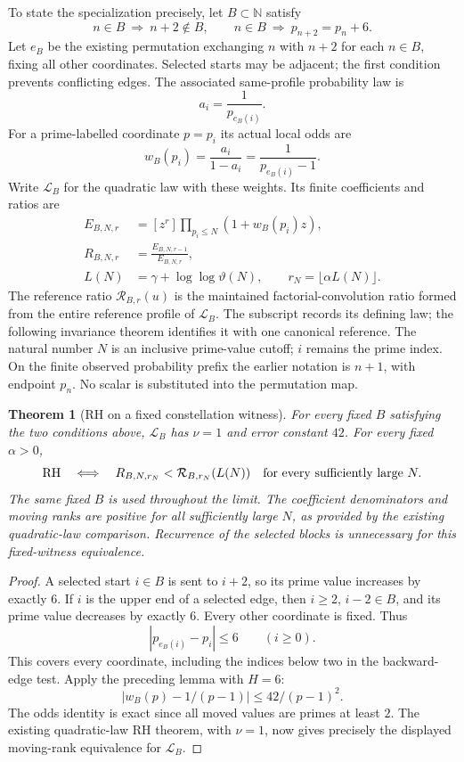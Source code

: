 \documentclass[11pt]{article}
\newtheorem{theorem}{Theorem}[section]
\theoremstyle{definition}
\begin{document}
To state the specialization precisely, let $B\subset\mathbb N$
satisfy
\[
 n\in B\ \Longrightarrow\ n+2\notin B,\qquad
 n\in B\ \Longrightarrow\ p_{n+2}=p_n+6.
\]
Let $e_B$ be the existing permutation exchanging $n$ with $n+2$
for each $n\in B$, fixing all other coordinates. Selected starts
may be adjacent; the first condition prevents conflicting edges.
The associated same-profile probability law is
\[
 a_i=\frac1{p_{e_B(i)}}.
\]
For a prime-labelled coordinate $p=p_i$ its actual local odds are
\[
 w_B(p_i)=\frac{a_i}{1-a_i}=\frac1{p_{e_B(i)}-1}.
\]
Write $\mathcal L_B$ for the quadratic law with these weights.
Its finite coefficients and ratios are
\[
 \begin{split}
 E_{B,N,r}&=[z^r]\prod_{p_i\le N}(1+w_B(p_i)z),\\
 R_{B,N,r}&=\frac{E_{B,N,r-1}}{E_{B,N,r}},\\
 L(N)&=\gamma+\log\log\vartheta(N),\qquad
 r_N=\lfloor\alpha L(N)\rfloor .
 \end{split}
\]
The reference ratio $\mathcal R_{B,r}(u)$ is the maintained
factorial-convolution ratio formed from the entire reference
profile of $\mathcal L_B$. The subscript records its defining law;
the following invariance theorem identifies it with one canonical
reference. The natural number $N$ is an inclusive prime-value
cutoff; $i$ remains the prime index. On the finite observed
probability prefix the earlier notation is $n+1$, with endpoint
$p_n$. No scalar is substituted into the permutation map.

\begin{theorem}[RH on a fixed constellation witness]
For every fixed $B$ satisfying the two conditions above,
$\mathcal L_B$ has $\nu=1$ and error constant $42$.
For every fixed $\alpha>0$,
\[
 \mathrm{RH}\quad\Longleftrightarrow\quad
 R_{B,N,r_N}<\mathcal R_{B,r_N}(L(N))
       \quad\hbox{for every sufficiently large }N.
\]
The same fixed $B$ is used throughout the limit.
The coefficient denominators and moving ranks are positive
for all sufficiently large $N$, as provided by the existing
quadratic-law comparison.
Recurrence of the selected blocks is unnecessary for this
fixed-witness equivalence.
\end{theorem}

\begin{proof}
A selected start $i\in B$ is sent to $i+2$, so its prime value
increases by exactly $6$. If $i$ is the upper end of a selected
edge, then $i\ge2$, $i-2\in B$, and its prime value decreases by
exactly $6$. Every other coordinate is fixed. Thus
\[
 |p_{e_B(i)}-p_i|\le6\qquad(i\ge0).
\]
This covers every coordinate, including the indices below two
in the backward-edge test. Apply the preceding lemma with $H=6$:
\[
 |w_B(p)-1/(p-1)|\le42/(p-1)^2.
\]
The odds identity is exact since all moved values are primes
at least $2$. The existing quadratic-law RH theorem, with
$\nu=1$, now gives precisely the displayed moving-rank
equivalence for $\mathcal L_B$.
\end{proof}
\end{document}
